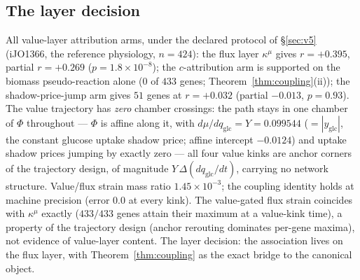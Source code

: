 \documentclass[11pt,a4paper]{article}
\theoremstyle{plain}
\theoremstyle{definition}
\theoremstyle{remark}
\newcommand{\kmu}{\kappa^{\mu}}
\begin{document}
\subsection{The layer decision}
\label{sec:v6}
All value-layer attribution arms, under the declared protocol of \S\ref{sec:v5} (iJO1366, the reference physiology, $n = 424$): the flux layer $\kmu$ gives $r = +0.395$,
partial $r = +0.269$ ($p = 1.8 \times 10^{-8}$); the $c$-attribution
arm is supported on the biomass pseudo-reaction alone ($0$ of $433$
genes; Theorem~\ref{thm:coupling}(ii)); the shadow-price-jump arm
gives $51$ genes at $r = +0.032$ (partial $-0.013$, $p = 0.93$). The
value trajectory has \emph{zero} chamber crossings: the path stays in
one chamber of $\Phi$ throughout --- $\Phi$ is affine along it, with
$d\mu/dq_{\mathrm{glc}} = Y = 0.099544$ ($= |y_{\mathrm{glc}}|$, the
constant glucose uptake shadow price; affine intercept $-0.0124$) and
uptake shadow prices jumping by exactly zero --- all four value kinks
are anchor corners of the trajectory design, of magnitude
$Y\,\Delta(dq_{\mathrm{glc}}/dt)$, carrying no network structure. Value/flux strain mass ratio
$1.45 \times 10^{-3}$; the coupling identity holds at machine
precision (error $0.0$ at every kink). The value-gated flux strain
coincides with $\kmu$ exactly ($433/433$ genes attain their maximum
at a value-kink time), a property of the trajectory design (anchor
rerouting dominates per-gene maxima), not evidence of value-layer
content. The layer decision: the association lives on the flux layer,
with Theorem~\ref{thm:coupling} as the exact bridge to the canonical
object.
\end{document}
